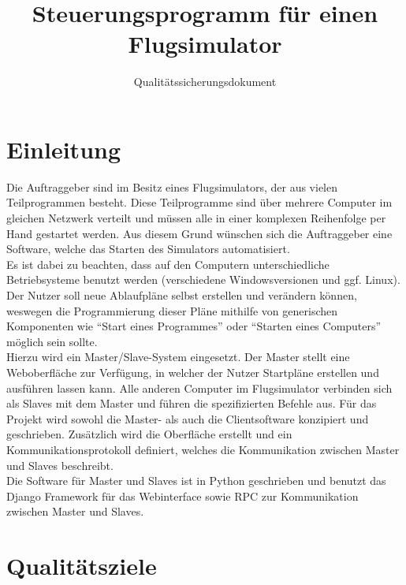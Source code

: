 \documentclass[accentcolor=tud9c,12pt,paper=a4]{tudreport}
\title{Steuerungsprogramm für einen Flugsimulator}
\subtitle{Qualitätssicherungsdokument}
\begin{document}
	\maketitle
	\tableofcontents

	\chapter{Einleitung}
		Die Auftraggeber sind im Besitz eines Flugsimulators, der aus vielen 
		Teilprogrammen besteht. Diese Teilprogramme sind über mehrere Computer im
		gleichen Netzwerk verteilt und müssen alle in einer komplexen Reihenfolge per Hand 
		gestartet werden. Aus diesem Grund wünschen sich die Auftraggeber eine Software, welche
		das Starten des Simulators automatisiert.\\[5pt]
		Es ist dabei zu beachten, dass auf den Computern unterschiedliche 
		Betriebsysteme benutzt werden (verschiedene Windowsversionen und ggf. Linux). 
		Der Nutzer soll neue Ablaufpläne selbst erstellen und verändern können,
		weswegen die Programmierung dieser Pläne mithilfe von generischen Komponenten
		wie "`Start eines Programmes"' oder "`Starten eines Computers"' möglich sein sollte.
		\\[5pt]
		Hierzu wird ein Master/Slave-System eingesetzt. Der Master stellt eine Weboberfläche zur
		Verfügung, in welcher der Nutzer Startpläne erstellen und ausführen lassen kann.
		Alle anderen Computer im Flugsimulator verbinden sich als Slaves mit dem Master und
		führen die spezifizierten Befehle aus.
		Für das Projekt wird sowohl die Master- als auch die Clientsoftware
		konzipiert und geschrieben. Zusätzlich wird die Oberfläche erstellt und ein
		Kommunikationsprotokoll definiert, welches die Kommunikation zwischen
		Master und Slaves beschreibt.
		\\[5pt]
		Die Software für Master und Slaves ist in Python geschrieben und benutzt
		das Django Framework für das Webinterface sowie RPC zur Kommunikation zwischen 
		Master und Slaves.
		

	\chapter{Qualitätsziele}
\end{document}
